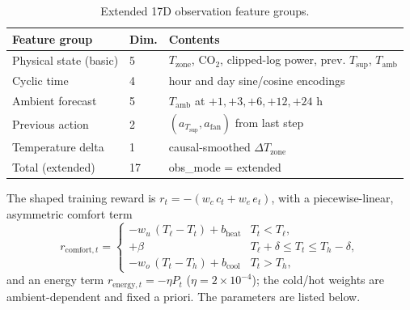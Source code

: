\documentclass[11pt,a4paper]{article}
\begin{document}
\begin{table}[H]
\centering
\caption{Extended 17D observation feature groups.}
\label{tab:obs17}
\small
\begin{tabularx}{\linewidth}{llX}
\toprule
Feature group & Dim. & Contents \\
\midrule
Physical state (basic) & 5 & $T_{\mathrm{zone}}$, CO$_2$, clipped-log power, prev. $T_{\mathrm{sup}}$, $T_{\mathrm{amb}}$ \\
Cyclic time & 4 & hour and day sine/cosine encodings \\
Ambient forecast & 5 & $T_{\mathrm{amb}}$ at $+1,+3,+6,+12,+24$ h \\
Previous action & 2 & $(a_{T_{\mathrm{sup}}}, a_{\mathrm{fan}})$ from last step \\
Temperature delta & 1 & causal-smoothed $\Delta T_{\mathrm{zone}}$ \\
Total (extended) & 17 & obs\_mode = extended \\
\bottomrule
\end{tabularx}
\end{table}
The shaped training reward is $r_t=-(w_c\,c_t + w_e\,e_t)$, with a piecewise-linear, asymmetric comfort term
\begin{equation}
 r_{\mathrm{comfort},t} =
 \begin{cases}
 -w_u\,(T_{\ell} - T_t) + b_{\mathrm{heat}} & T_t < T_{\ell}, \\
 +\beta & T_{\ell}+\delta \le T_t \le T_h-\delta, \\
 -w_o\,(T_t - T_h) + b_{\mathrm{cool}} & T_t > T_h,
 \end{cases}
 \label{eq:comfort}
\end{equation}
and an energy term $r_{\mathrm{energy},t}=-\eta P_t$ ($\eta=2\times10^{-4}$); the cold/hot weights are ambient-dependent and fixed a priori. The parameters are listed below.
\end{document}

